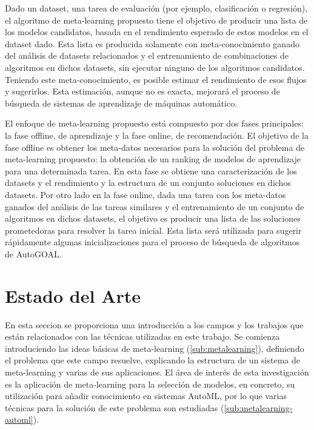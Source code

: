\documentclass[a4paper,10pt,twocolumn]{article}
\begin{document}
 Dado un dataset, una tarea de evaluación (por ejemplo, clasificación o regresión), el algoritmo de meta-learning propuesto tiene el objetivo de producir una lista de los modelos candidatos, basada en el rendimiento esperado de estos modelos en el dataset dado. Esta lista es producida solamente con meta-conocimiento ganado del análisis de datasets relacionados y el entrenamiento de combinaciones de algoritmos en dichos datasets, sin ejecutar ninguno de los algoritmos candidatos. Teniendo este meta-conocimiento, es posible estimar el rendimiento de esos flujos y sugerirlos. Esta estimación, aunque no es exacta, mejorará el proceso de búsqueda de sistemas de aprendizaje de máquinas automático.

 El enfoque de meta-learning propuesto está compuesto por dos fases principales: la fase offline, de aprendizaje y la fase online, de recomendación. El objetivo de la fase offline es obtener los meta-datos necesarios para la solución del problema de meta-learning propuesto: la obtención de un ranking de modelos de aprendizaje para una determinada tarea. En esta fase se obtiene una caracterización de los datasets y el rendimiento y la estructura de un conjunto soluciones en dichos datasets. Por otro lado en la fase online, dada una tarea con los meta-datos ganados del análisis de las tareas similares y el entrenamiento de un conjunto de algoritmos en dichos datasets, el objetivo es producir una lista de las soluciones prometedoras para resolver la tarea inicial. Esta lista será utilizada para sugerir rápidamente algunas inicializaciones para el proceso de búsqueda de algoritmos de AutoGOAL.




\section{Estado del Arte}\label{sec:review}
En esta seccion se proporciona una introducción a los campos y los trabajos que están relacionados con las técnicas utilizadas en este trabajo. Se comienza introduciendo las ideas básicas de meta-learning (\ref{sub:metalearning}), definiendo el problema que este campo resuelve, explicando la estructura de un sistema de meta-learning y varias de sus aplicaciones. El área de interés de esta investigación es la aplicación de meta-learning para la selección de modelos, en concreto, su utilización para añadir conocimiento en sistemas AutoML, por lo que varias técnicas para la solución de este problema son estudiadas (\ref{sub:metalearning-automl}).
\end{document}
